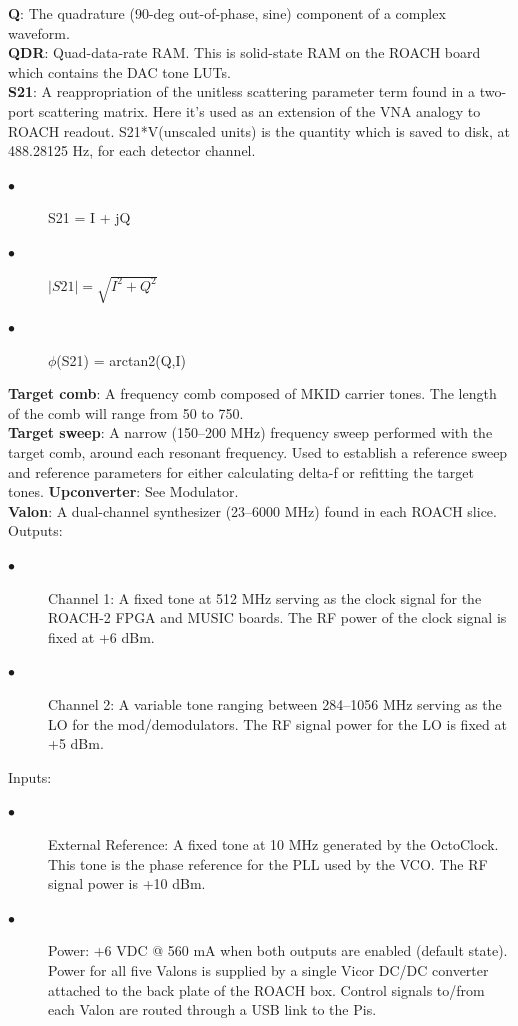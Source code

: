 \textbf{Q}: The quadrature (90-deg out-of-phase, sine) component of a complex waveform.\\
\textbf{QDR}: Quad-data-rate RAM. This is solid-state RAM on the ROACH board which contains the DAC tone LUTs.\\
\textbf{S21}: A reappropriation of the unitless scattering parameter term found in a two-port scattering matrix. Here it’s used as an extension of the VNA analogy to ROACH readout. S21*V(unscaled units) is the quantity which is saved to disk, at 488.28125 Hz, for each detector channel.
\begin{description}
  \item[$\bullet$] S21 = I + jQ
  \item[$\bullet$] $\left|S21\right| = \sqrt{I^{2} + Q^{2}}$
  \item[$\bullet$] $\phi$(S21) = arctan2(Q,I)
\end{description}
\textbf{Target comb}: A frequency comb composed of MKID carrier tones. The length of the comb will range from 50 to 750.\\
\textbf{Target sweep}: A narrow (150--200 MHz) frequency sweep performed with the target comb, around each resonant frequency. Used to establish a reference sweep and reference parameters for either calculating delta-f or refitting the target tones.
\textbf{Upconverter}: See Modulator.\\
\textbf{Valon}: A dual-channel synthesizer (23--6000 MHz) found in each ROACH slice.\\
Outputs:
\begin{description}
  \item[$\bullet$] Channel 1: A fixed tone at 512 MHz serving as the clock signal for the ROACH-2 FPGA and MUSIC boards. The RF power of the clock signal is fixed at +6 dBm.
  \item[$\bullet$] Channel 2: A variable tone ranging between 284--1056 MHz serving as the LO for the mod/demodulators. The RF signal power for the LO is fixed at +5 dBm.
\end{description}
Inputs:
\begin{description}
  \item[$\bullet$] External Reference: A fixed tone at 10 MHz generated by the OctoClock. This tone is the phase reference for the PLL used by the VCO. The RF signal power is +10 dBm.
  \item[$\bullet$] Power: +6 VDC @ 560 mA when both outputs are enabled (default state). Power for all five Valons is supplied by a single Vicor DC/DC converter attached to the back plate of the ROACH box. Control signals to/from each Valon are routed through a USB link to the Pis.
\end{description}
